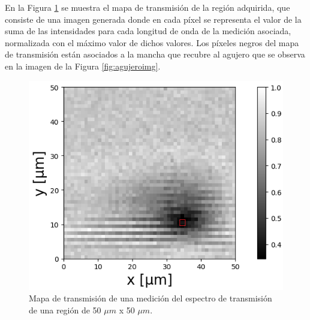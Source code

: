 En la Figura \ref{fig:mapatransmag} se muestra el mapa de transmisión de la región adquirida, que consiste de una imagen generada donde en cada píxel se representa el valor de la suma de las intensidades para cada longitud de onda de la medición asociada, normalizada con el máximo valor de dichos valores. Los píxeles negros del mapa de transmisión están asociados a la mancha que recubre al agujero que se observa en la imagen de la Figura \ref{fig:agujeroimg}.
 \begin{figure}[H]
	\centering
	\includegraphics[width=1.0\textwidth]{Figs/microespectrometro/tranhueco.png}
	\caption{Mapa de transmisión de una medición del espectro de transmisión de una región de 50 $\mu m$ x 50 $\mu m$. }
	\label{fig:mapatransmag}
\end{figure}

